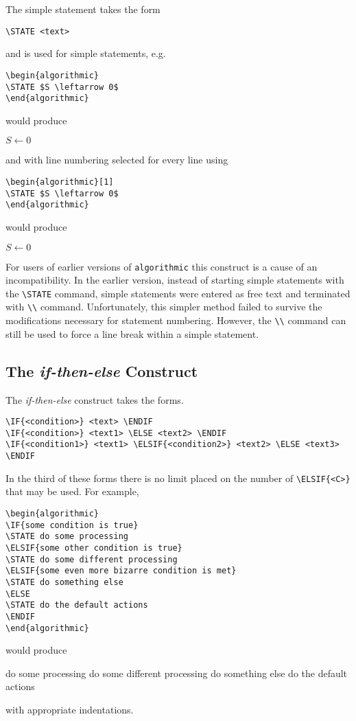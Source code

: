 \documentclass{article}
\newcommand{\keyword}[1]{\texttt{#1}}
\begin{document}
The simple statement takes the form
\begin{verbatim}
\STATE <text>
\end{verbatim}
and is used for simple statements, e.g.
\begin{verbatim}
\begin{algorithmic}
\STATE $S \leftarrow 0$
\end{algorithmic}
\end{verbatim}
would produce
\begin{algorithmic}
  \STATE $S \leftarrow 0$
\end{algorithmic}
and with line numbering selected for every line using
\begin{verbatim}
\begin{algorithmic}[1]
\STATE $S \leftarrow 0$
\end{algorithmic}
\end{verbatim}
would produce
\begin{algorithmic}[1]
  \STATE $S \leftarrow 0$
\end{algorithmic}
For users of earlier versions of \keyword{algorithmic} this construct is
a cause of an incompatibility.
In the earlier version, instead of starting simple statements with the
\verb+\STATE+
command, simple statements were entered as free text and terminated with
\verb+\\+ command.
Unfortunately, this simpler method failed to survive the modifications
necessary for statement numbering.
However, the \verb+\\+ command can still be used to force a line break within
a simple statement.

\subsection{The \emph{if-then-else} Construct}

The \emph{if-then-else} construct takes the forms.
\begin{verbatim}
\IF{<condition>} <text> \ENDIF
\IF{<condition>} <text1> \ELSE <text2> \ENDIF
\IF{<condition1>} <text1> \ELSIF{<condition2>} <text2> \ELSE <text3> \ENDIF
\end{verbatim}
In the third of these forms there is no limit placed on the number
of \verb+\ELSIF{<C>}+ that may be used.
For example,
\begin{verbatim}
\begin{algorithmic}
\IF{some condition is true}
\STATE do some processing
\ELSIF{some other condition is true}
\STATE do some different processing
\ELSIF{some even more bizarre condition is met}
\STATE do something else
\ELSE
\STATE do the default actions
\ENDIF
\end{algorithmic}
\end{verbatim}
would produce
\begin{algorithmic}
  \STATE do some processing
  \STATE do some different processing
  \STATE do something else
  \ELSE
  \STATE do the default actions
  \ENDIF
\end{algorithmic}
with appropriate indentations.
\end{document}
